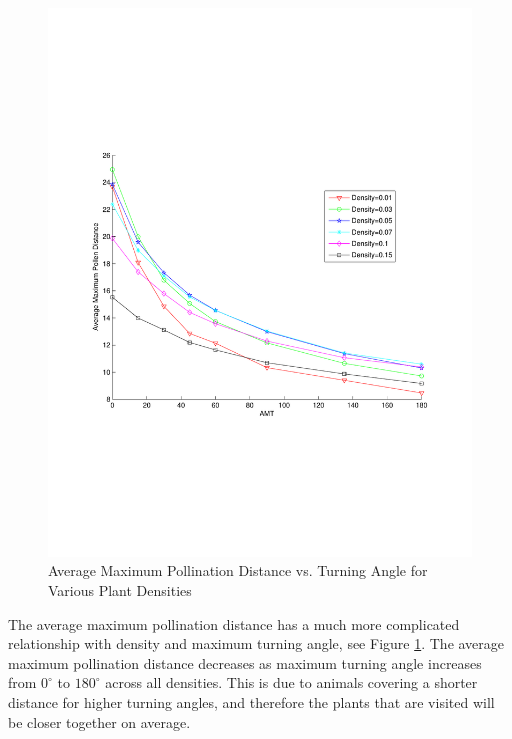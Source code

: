 \begin{figure}
  \begin{center}
  \includegraphics[width=1.0\textwidth]{MaxPollenVsAMT.pdf}
  \end{center}
  \caption{\small Average Maximum Pollination Distance vs. Turning Angle for Various Plant Densities}
  \label{AvgMaxDTreesN}
\end{figure}

The average maximum pollination distance has a much more complicated relationship with density and
maximum turning angle, see Figure \ref{AvgMaxDTreesN}.  The average maximum pollination distance
decreases as maximum turning angle increases from $0^{\circ}$ to $180^{\circ}$ across all densities.
This is due to animals covering a shorter distance for higher turning angles, and therefore the
plants that are visited will be closer together on average. 

